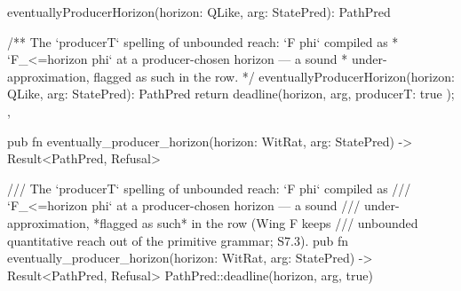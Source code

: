 \begin{tssrc}
eventuallyProducerHorizon(horizon: QLike, arg: StatePred): PathPred
\end{tssrc}
\begin{tssrc}
/** The `producerT` spelling of unbounded reach: `F phi` compiled as
 * `F_{<=horizon} phi` at a producer-chosen horizon — a sound
 * under-approximation, flagged as such in the row. */
eventuallyProducerHorizon(horizon: QLike, arg: StatePred): PathPred {
  return deadline(horizon, arg, { producerT: true });
},
\end{tssrc}
\begin{rustsrc}
pub fn eventually_producer_horizon(horizon: WitRat, arg: StatePred) -> Result<PathPred, Refusal>
\end{rustsrc}
\begin{rustsrc}
/// The `producerT` spelling of unbounded reach: `F phi` compiled as
/// `F_{<=horizon} phi` at a producer-chosen horizon — a sound
/// under-approximation, *flagged as such* in the row (Wing F keeps
/// unbounded quantitative reach out of the primitive grammar; S7.3).
pub fn eventually_producer_horizon(horizon: WitRat, arg: StatePred) -> Result<PathPred, Refusal> {
    PathPred::deadline(horizon, arg, true)
}
\end{rustsrc}

